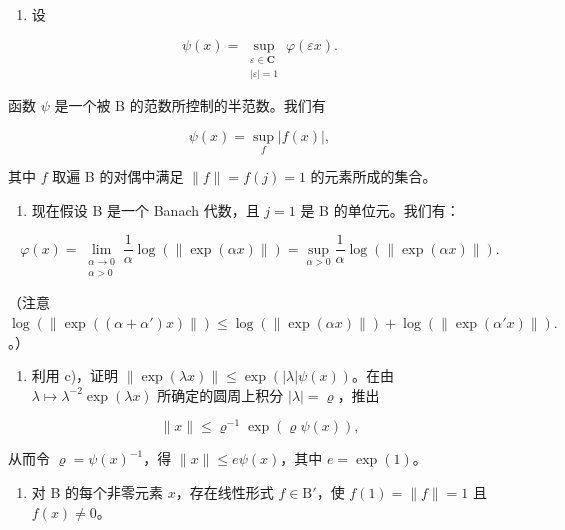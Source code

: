 \begin{enumerate}
\def\labelenumi{\alph{enumi})}
\setcounter{enumi}{1}
\tightlist
\item
  设
\end{enumerate}

\[
\psi (x) = \sup_{\substack{\varepsilon \in \mathbf{C}\\ |\varepsilon | = 1}}\varphi (\varepsilon x).
\]

函数 \(\psi\) 是一个被 B 的范数所控制的半范数。我们有

\[
\psi (x) = \sup _ {f} | f (x) |,
\]

其中 \(f\) 取遍 B 的对偶中满足 \(\|f\| = f(j) = 1\) 的元素所成的集合。

\begin{enumerate}
\def\labelenumi{\alph{enumi})}
\setcounter{enumi}{2}
\tightlist
\item
  现在假设 B 是一个 Banach 代数，且 \(j = 1\) 是 B 的单位元。我们有：
\end{enumerate}

\[
\varphi (x) = \lim_{\substack{\alpha \to 0\\ \alpha >0}}\frac{1}{\alpha}\log (\| \exp (\alpha x)\|) = \sup_{\alpha >0}\frac{1}{\alpha}\log (\| \exp (\alpha x)\|).
\]

（注意 \(\log(\|\exp((\alpha+\alpha')x)\|) \leqslant \log(\|\exp(\alpha x)\|) + \log(\|\exp(\alpha' x)\|).\)。）

\begin{enumerate}
\def\labelenumi{\alph{enumi})}
\setcounter{enumi}{3}
\tightlist
\item
  利用 c)，证明 \(\|\exp(\lambda x)\| \leqslant \exp(|\lambda|\psi(x))\)。在由 \(\lambda \mapsto \lambda^{-2} \exp(\lambda x)\) 所确定的圆周上积分 \(|\lambda| = \varrho\)，推出
\end{enumerate}

\[
\| x \| \leqslant \varrho^ {- 1} \exp (\varrho \psi (x)),
\]

从而令 \(\varrho = \psi(x)^{-1}\)，得 \(\|x\| \leqslant e\psi(x)\)，其中 \(e = \exp(1)\)。

\begin{enumerate}
\def\labelenumi{\alph{enumi})}
\setcounter{enumi}{4}
\tightlist
\item
  对 B 的每个非零元素 \(x\)，存在线性形式 \(f \in \mathrm{B}'\)，使 \(f(1) = \| f \| = 1\) 且 \(f(x) \neq 0\)。
\end{enumerate}

